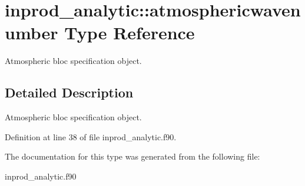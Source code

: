 \hypertarget{structinprod__analytic_1_1atmosphericwavenumber}{}\section{inprod\+\_\+analytic\+:\+:atmosphericwavenumber Type Reference}
\label{structinprod__analytic_1_1atmosphericwavenumber}


Atmospheric bloc specification object.  




\subsection{Detailed Description}
Atmospheric bloc specification object. 

Definition at line 38 of file inprod\+\_\+analytic.\+f90.



The documentation for this type was generated from the following file\+:\begin{DoxyCompactItemize}
\item 
inprod\+\_\+analytic.\+f90\end{DoxyCompactItemize}
